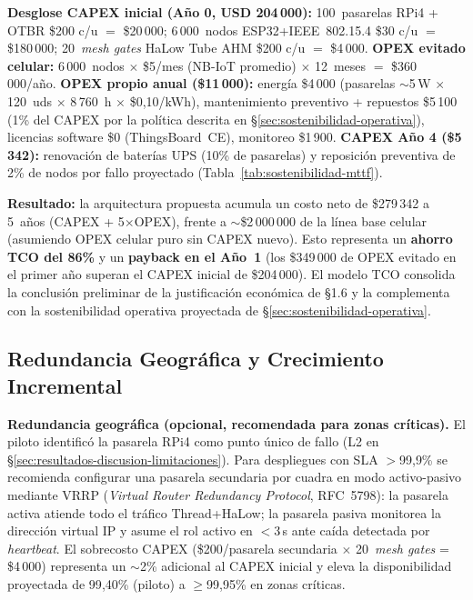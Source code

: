 \textbf{Desglose CAPEX inicial (Año 0, USD 204\,000):} 100~pasarelas RPi4 + OTBR \$200 c/u $=$ \$20\,000; 6\,000~nodos ESP32+IEEE~802.15.4 \$30 c/u $=$ \$180\,000; 20~\emph{mesh gates} HaLow Tube AHM \$200 c/u $=$ \$4\,000. \textbf{OPEX evitado celular:} 6\,000~nodos $\times$ \$5/mes (NB-IoT promedio) $\times$ 12~meses $=$ \$360\,000/año. \textbf{OPEX propio anual (\$11\,000):} energía \$4\,000 (pasarelas $\sim$5\,W $\times$ 120~uds $\times$ 8\,760~h $\times$ \$0{,}10/kWh), mantenimiento preventivo + repuestos \$5\,100 (1\% del CAPEX por la política descrita en §\ref{sec:sostenibilidad-operativa}), licencias software \$0 (ThingsBoard~CE), monitoreo \$1\,900. \textbf{CAPEX Año 4 (\$5\,342):} renovación de baterías UPS (10\% de pasarelas) y reposición preventiva de 2\% de nodos por fallo proyectado (Tabla~\ref{tab:sostenibilidad-mttf}).

\textbf{Resultado:} la arquitectura propuesta acumula un costo neto de \$279\,342 a 5~años (CAPEX + 5$\times$OPEX), frente a $\sim$\$2\,000\,000 de la línea base celular (asumiendo OPEX celular puro sin CAPEX nuevo). Esto representa un \textbf{ahorro TCO del 86\%} y un \textbf{payback en el Año~1} (los \$349\,000 de OPEX evitado en el primer año superan el CAPEX inicial de \$204\,000). El modelo TCO consolida la conclusión preliminar de la justificación económica de §1.6 y la complementa con la sostenibilidad operativa proyectada de §\ref{sec:sostenibilidad-operativa}.

\subsection{Redundancia Geográfica y Crecimiento Incremental}
\label{sec:viabilidad-redundancia-crecimiento}

\textbf{Redundancia geográfica (opcional, recomendada para zonas críticas).} El piloto identificó la pasarela RPi4 como punto único de fallo (L2 en §\ref{sec:resultados-discusion-limitaciones}). Para despliegues con SLA $>$99{,}9\% se recomienda configurar una pasarela secundaria por cuadra en modo activo-pasivo mediante VRRP (\emph{Virtual Router Redundancy Protocol}, RFC~5798): la pasarela activa atiende todo el tráfico Thread+HaLow; la pasarela pasiva monitorea la dirección virtual IP y asume el rol activo en $<$3\,s ante caída detectada por \emph{heartbeat}. El sobrecosto CAPEX (\$200/pasarela secundaria $\times$ 20~\emph{mesh gates} = \$4\,000) representa un $\sim$2\% adicional al CAPEX inicial y eleva la disponibilidad proyectada de 99{,}40\% (piloto) a $\geq$99{,}95\% en zonas críticas.

